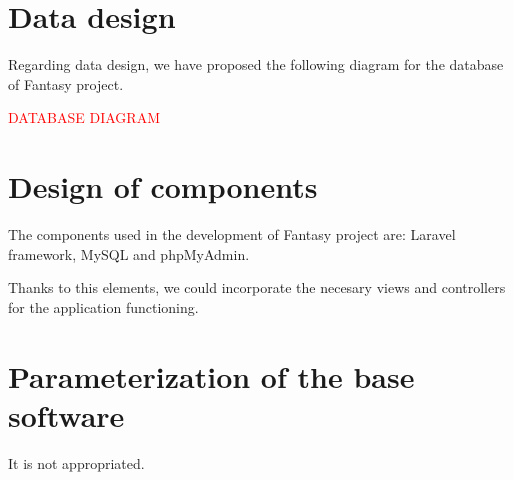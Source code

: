 \section{Data design}
Regarding data design, we have proposed the following diagram for the database of Fantasy project.

\textcolor{red}{DATABASE DIAGRAM}


\section{Design of components}
The components used in the development of Fantasy project are: Laravel framework, MySQL and phpMyAdmin.

Thanks to this elements, we could incorporate the necesary views and controllers for the application functioning.

\section{Parameterization of the base software}
It is not appropriated.